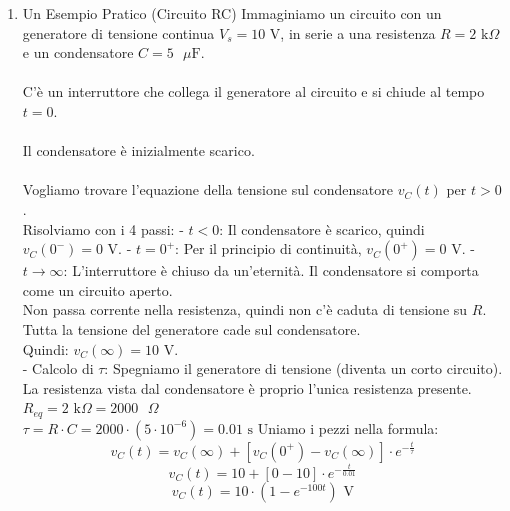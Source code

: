 \documentclass[../main.tex]{subfiles}
\begin{document}
\begin{enumerate}
\begin{itemize}
			\end{itemize}
		\item Un Esempio Pratico (Circuito RC)
			Immaginiamo un circuito con un generatore di tensione continua $V_s = 10\text{ V}$, in serie a una resistenza $R = 2\text{ k}\Omega$ e un condensatore $C = 5\text{ }\mu\text{F}$.\\\\
			C'è un interruttore che collega il generatore al circuito e si chiude al tempo $t = 0$. \\\\
			Il condensatore è inizialmente scarico. \\\\
			Vogliamo trovare l'equazione della tensione sul condensatore $v_C(t)$ per $t > 0$.\\
			Risolviamo con i 4 passi:
			- $t < 0$: Il condensatore è scarico, quindi $v_C(0^-) = 0\text{ V}$.
			- $t = 0^+$: Per il principio di continuità, $v_C(0^+) = 0\text{ V}$.
			- $t \to \infty$: L'interruttore è chiuso da un'eternità. Il condensatore si comporta come un circuito aperto. \\
			Non passa corrente nella resistenza, quindi non c'è caduta di tensione su $R$. \\
			Tutta la tensione del generatore cade sul condensatore. \\
			Quindi: $v_C(\infty) = 10\text{ V}$.\\
			- Calcolo di $\tau$: Spegniamo il generatore di tensione (diventa un corto circuito). La resistenza vista dal condensatore è proprio l'unica resistenza presente.\\
			$R_{eq} = 2\text{ k}\Omega = 2000\text{ }\Omega$\\
			$\tau = R \cdot C = 2000 \cdot (5 \cdot 10^{-6}) = 0.01\text{ s}$
			Uniamo i pezzi nella formula:\\
			$$v_C(t) = v_C(\infty) + [v_C(0^+) - v_C(\infty)] \cdot e^{-\frac{t}{\tau}}$$
			$$v_C(t) = 10 + [0 - 10] \cdot e^{-\frac{t}{0.01}}$$
			$$v_C(t) = 10 \cdot (1 - e^{-100t})\text{ V}$$
	\end{enumerate}
\end{document}
